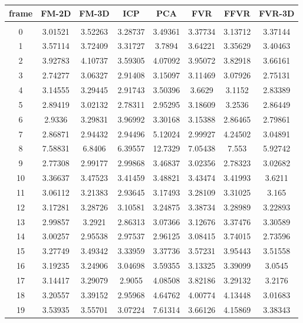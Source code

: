 \begin{center}
\begin{longtable}{cccccccc}
\hline
\textbf{frame} & \textbf{FM-2D} & \textbf{FM-3D} & \textbf{ICP} & \textbf{PCA} & \textbf{FVR} & \textbf{FFVR} & \textbf{FVR-3D} \\
\hline \\
0 & 3.01521 & 3.52263 & 3.28737 & 3.49361 & 3.37734 & 3.13712 & 3.37144\\
1 & 3.57114 & 3.72409 & 3.31727 & 3.7894 & 3.64221 & 3.35629 & 3.40463\\
2 & 3.92783 & 4.10737 & 3.59305 & 4.07092 & 3.95072 & 3.82918 & 3.66161\\
3 & 2.74277 & 3.06327 & 2.91408 & 3.15097 & 3.11469 & 3.07926 & 2.75131\\
4 & 3.14555 & 3.29445 & 2.91743 & 3.50396 & 3.6629 & 3.1152 & 2.83389\\
5 & 2.89419 & 3.02132 & 2.78311 & 2.95295 & 3.18609 & 3.2536 & 2.86449\\
6 & 2.9336 & 3.29831 & 3.96992 & 3.30168 & 3.15388 & 2.86465 & 2.79861\\
7 & 2.86871 & 2.94432 & 2.94496 & 5.12024 & 2.99927 & 4.24502 & 3.04891\\
8 & 7.58831 & 6.8406 & 6.39557 & 12.7329 & 7.05438 & 7.553 & 5.92742\\
9 & 2.77308 & 2.99177 & 2.99868 & 3.46837 & 3.02356 & 2.78323 & 3.02682\\
10 & 3.36637 & 3.47523 & 3.41459 & 3.48821 & 3.43474 & 3.41993 & 3.6211\\
11 & 3.06112 & 3.21383 & 2.93645 & 3.17493 & 3.28109 & 3.31025 & 3.165\\
12 & 3.17281 & 3.28726 & 3.10581 & 3.24875 & 3.38734 & 3.28989 & 3.22893\\
13 & 2.99857 & 3.2921 & 2.86313 & 3.07366 & 3.12676 & 3.37476 & 3.30589\\
14 & 3.00257 & 2.95538 & 2.97537 & 2.96125 & 3.08415 & 3.74015 & 2.73596\\
15 & 3.27749 & 3.49342 & 3.33959 & 3.37736 & 3.57231 & 3.95443 & 3.51558\\
16 & 3.19235 & 3.24906 & 3.04698 & 3.59355 & 3.13325 & 3.39099 & 3.0545\\
17 & 3.14417 & 3.29079 & 2.9055 & 4.08508 & 3.82186 & 3.29132 & 3.2176\\
18 & 3.20557 & 3.39152 & 2.95968 & 4.64762 & 4.00774 & 4.13448 & 3.01683\\
19 & 3.53935 & 3.55701 & 3.07224 & 7.61314 & 3.66126 & 4.15869 & 3.38343\\

\end{longtable}
\end{center}
